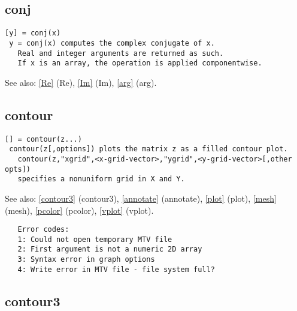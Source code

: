 \documentclass[a4paper]{article}
\begin{document}
\subsection{conj\label{conj}}

\begin{tscreen}
\begin{verbatim}
[y] = conj(x)
 y = conj(x) computes the complex conjugate of x.
   Real and integer arguments are returned as such.
   If x is an array, the operation is applied componentwise.
\end{verbatim}

See also: \ref{Re} {(Re)}, \ref{Im} {(Im)}, \ref{arg} {(arg)}.
\end{tscreen}





\subsection{contour\label{contour}}

\begin{tscreen}
\begin{verbatim}
[] = contour(z...)
 contour(z[,options]) plots the matrix z as a filled contour plot.
   contour(z,"xgrid",<x-grid-vector>,"ygrid",<y-grid-vector>[,other opts])
   specifies a nonuniform grid in X and Y.
\end{verbatim}

See also: \ref{contour3} {(contour3)}, \ref{annotate} {(annotate)}, \ref{plot} {(plot)}, \ref{mesh} {(mesh)}, \ref{pcolor} {(pcolor)}, \ref{vplot} {(vplot)}.
\begin{verbatim}
   Error codes:
   1: Could not open temporary MTV file
   2: First argument is not a numeric 2D array
   3: Syntax error in graph options
   4: Write error in MTV file - file system full? 
\end{verbatim}
\end{tscreen}





\subsection{contour3\label{contour3}}
\end{document}
